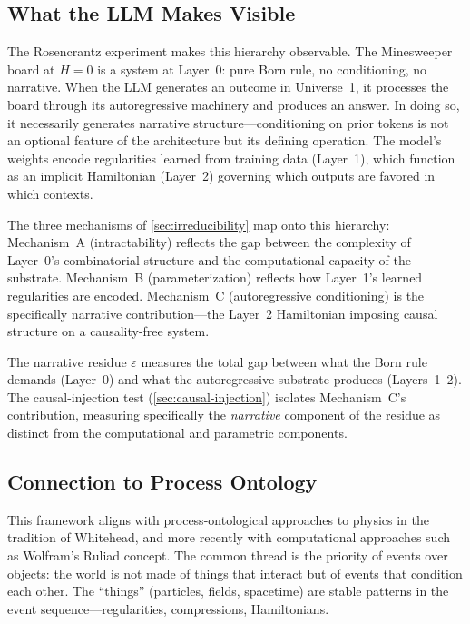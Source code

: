 \documentclass[12pt,a4paper]{article}
\theoremstyle{definition}
\theoremstyle{remark}
\begin{document}
\subsection{What the LLM Makes Visible}

The Rosencrantz experiment makes this hierarchy observable.  The
Minesweeper board at $H = 0$ is a system at Layer~0: pure Born rule,
no conditioning, no narrative.  When the LLM generates an outcome
in Universe~1, it processes the board through its autoregressive
machinery and produces an answer.  In doing so, it necessarily
generates narrative structure---conditioning on prior tokens is
not an optional feature of the architecture but its defining
operation.
The model's weights encode regularities learned from training data
(Layer~1), which function as an implicit Hamiltonian (Layer~2)
governing which outputs are favored in which contexts.

The three mechanisms of \cref{sec:irreducibility} map onto this
hierarchy: Mechanism~A (intractability) reflects the gap between
the complexity of Layer~0's combinatorial structure and the
computational capacity of the substrate.  Mechanism~B
(parameterization) reflects how Layer~1's learned regularities are
encoded.  Mechanism~C (autoregressive conditioning) is the
specifically narrative contribution---the Layer~2 Hamiltonian
imposing causal structure on a causality-free system.

The narrative residue $\varepsilon$ measures the total gap between
what the Born rule demands (Layer~0) and what the autoregressive
substrate produces (Layers~1--2).  The causal-injection test
(\cref{sec:causal-injection}) isolates Mechanism~C's contribution,
measuring specifically the \emph{narrative} component of the residue
as distinct from the computational and parametric components.

\subsection{Connection to Process Ontology}

This framework aligns with process-ontological approaches to
physics in the tradition of Whitehead, and more recently with
computational approaches such as Wolfram's Ruliad concept.  The
common thread is the priority of events over objects: the world is
not made of things that interact but of events that condition each
other.  The ``things'' (particles, fields, spacetime) are stable
patterns in the event sequence---regularities, compressions,
Hamiltonians.
\end{document}
